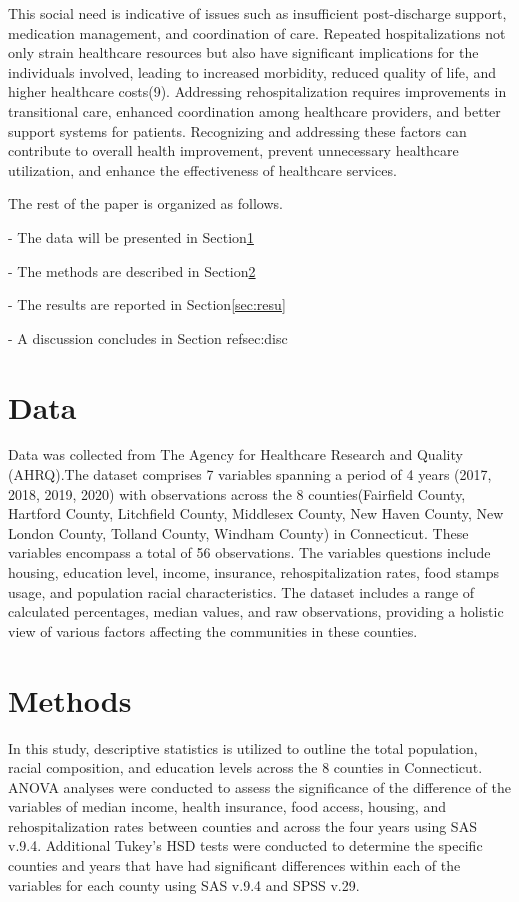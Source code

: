 \documentclass[12pt]{article}
\begin{document}
This social
need is indicative of issues such as
insufficient post-discharge support,
medication management, and coordination
of care. Repeated hospitalizations not
only strain healthcare resources but also
have significant implications for the
individuals involved, leading to increased
morbidity, reduced quality of life, and
higher healthcare costs(9). Addressing
rehospitalization requires improvements
in transitional care, enhanced coordination
among healthcare providers, and better
support systems for patients. Recognizing and
addressing these factors can contribute
to overall health improvement, prevent
unnecessary healthcare utilization, and
enhance the effectiveness of healthcare
services.

The rest of the paper is organized as follows.

- The data will be presented in Section\ref{sec:data}

- The methods are described in Section\ref{sec:meth}

- The results are reported in Section\ref{sec:resu}

- A discussion concludes in Section ref{sec:disc}

\section{Data}\label{sec:data}

Data was collected from The Agency for Healthcare Research and Quality (AHRQ).The dataset comprises 7 variables 
spanning a period of 4 years (2017, 2018, 2019, 2020) with observations across the 8 counties(Fairfield County, Hartford County, 
Litchfield County, Middlesex County, New Haven County, New London County, Tolland County, Windham County) in Connecticut. These variables 
encompass a total of 56 observations. The variables questions include housing, education level, income, insurance,
rehospitalization rates, food stamps usage, and population racial characteristics. The dataset includes a range of 
calculated percentages, median values, and raw observations, providing a holistic view of various factors affecting 
the communities in these counties. 

\section{Methods}\label{sec:meth}

In this study, descriptive statistics is utilized to outline the total population, racial composition, 
and education levels across the 8 counties in Connecticut. ANOVA analyses were 
conducted to assess the significance of the difference of the variables of median income, health insurance, food access, housing, 
and rehospitalization rates between counties and across the four years using SAS v.9.4. Additional 
Tukey's HSD tests were conducted to determine the specific counties and years that have had significant differences within 
each of the variables for each county using SAS v.9.4 and SPSS v.29.
\end{document}
